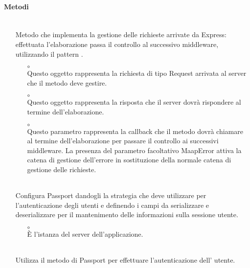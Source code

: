 \paragraph*{Metodi}
\begin{itemize}
\item[]  \\ Metodo che implementa la gestione delle richieste arrivate da Express: effettuata l'elaborazione passa il controllo al successivo middleware, utilizzando il pattern .
\begin{itemize}\addtolength{\itemsep}{-0.5\baselineskip}
\item[$\circ$]  \\ Questo oggetto rappresenta la richiesta di tipo Request arrivata al server che il metodo deve gestire.
\item[$\circ$]  \\ Questo oggetto rappresenta la risposta che il server dovrà rispondere al termine dell'elaborazione.
\item[$\circ$]  \\ Questo parametro rappresenta la callback che il metodo dovrà chiamare al termine dell'elaborazione per passare il controllo ai successivi middleware. La presenza del parametro facoltativo MaapError attiva la catena di gestione dell'errore in sostituzione della normale catena di gestione delle richieste.
\end{itemize}
\item[]  \\ Configura Passport dandogli la strategia che deve utilizzare per l'autenticazione degli utenti e definendo i campi da serializzare e deserializzare per il mantenimento delle informazioni sulla sessione utente.
\begin{itemize}\addtolength{\itemsep}{-0.5\baselineskip}
\item[$\circ$]  \\ È l'istanza del server dell'applicazione.
\end{itemize}
\item[]  \\ Utilizza il metodo  di Passport per effettuare l'autenticazione dell' utente.
\begin{itemize}\addtolength{\itemsep}{-0.5\baselineskip}

\end{itemize}
\end{itemize}
